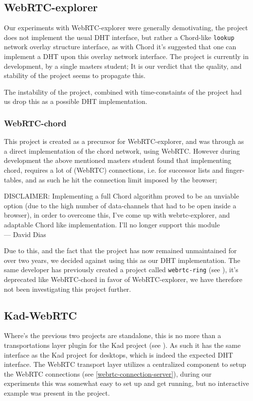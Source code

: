 \subsection{WebRTC-explorer}
Our experiments with WebRTC-explorer were generally demotivating, the project
does not implement the usual \acs{DHT} interface, but rather a Chord-like
\verb|lookup| network overlay structure interface, as with Chord it's suggested
that one can implement a \acs{DHT} upon this overlay network interface.
\newline
The project is currently in development, by a single masters student; It is our
verdict that the quality, and stability of the project seems to propagate this.

The instability of the project, combined with time-constaints of the project
had us drop this as a possible \acs{DHT} implementation.

\subsubsection{WebRTC-chord}
This project is created as a precursor for WebRTC-explorer, and was through as
a direct implementation of the chord network, using WebRTC. However during 
development the above mentioned masters student found that implementing chord,
requires a lot of (WebRTC) connections, i.e. for successor lists and
finger-tables, and as such he hit the connection limit imposed by the browser;

\begin{displayquote}
    DISCLAIMER: Implementing a full Chord algorithm proved to be an unviable option
    (due to the high number of data-channels that had to be open inside a browser),
    in order to overcome this, I've come up with webrtc-explorer, and adaptable
    Chord like implementation. I'll no longer support this module \\ \medskip
    --- David Dias
\end{displayquote}
Due to this, and the fact that the project has now remained unmaintained for
over two years, we decided against using this as our \acs{DHT} implementation.
\newline\newline
The same developer has previously created a project called \verb|webrtc-ring|
(see \citep{diasdavid:webrtc-ring}), it's deprecated like WebRTC-chord in favor
of WebRTC-explorer, we have therefore not been investigating this project
further.

\subsection{Kad-WebRTC}
Where's the previous two projects are standalone, this is no more than a 
transportations layer plugin for the Kad project (see \citep{kadtools:kad}).
As such it has the same interface as the Kad project for desktops, which is
indeed the  expected \acs{DHT} interface. The WebRTC transport layer utilizes a
centralized component to setup the WebRTC connections (see
\ref{webrtc-connection-server}), during our experiments this was somewhat easy
to set up and get running, but no interactive example was present in the
project.


